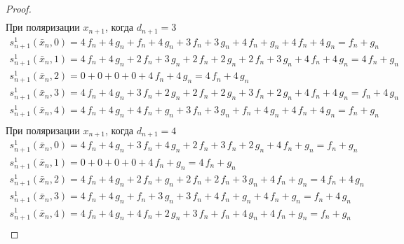 \documentclass[bibliography=totoc, a4paper, 14pt]{extarticle}
\begin{document}
\begin{proof}
$$\begin{array}{l}
\end{array}$$
При поляризации $x_{n+1}$, когда $d_{n+1} = 3$
$$\begin{array}{l}
s_{n+1}^1(\bar{x}_n, 0) = 4\,f_n + 4\,g_n + f_n + 4\,g_n + 3\,f_n + 3\,g_n + 4\,f_n + g_n + 4\,f_n + 4\,g_n = f_n + g_n \\
s_{n+1}^1(\bar{x}_n, 1) = 4\,f_n + 4\,g_n + 2\,f_n + 3\,g_n + 2\,f_n + 2\,g_n + 2\,f_n + 3\,g_n + 4\,f_n + 4\,g_n = 4\,f_n + g_n \\
s_{n+1}^1(\bar{x}_n, 2) = 0 + 0 + 0 + 0 + 4\,f_n + 4\,g_n = 4\,f_n + 4\,g_n \\
s_{n+1}^1(\bar{x}_n, 3) = 4\,f_n + 4\,g_n + 3\,f_n + 2\,g_n + 2\,f_n + 2\,g_n + 3\,f_n + 2\,g_n + 4\,f_n + 4\,g_n = f_n + 4\,g_n \\
s_{n+1}^1(\bar{x}_n, 4) = 4\,f_n + 4\,g_n + 4\,f_n + g_n + 3\,f_n + 3\,g_n + f_n + 4\,g_n + 4\,f_n + 4\,g_n = f_n + g_n \\
\end{array}$$
При поляризации $x_{n+1}$, когда $d_{n+1} = 4$
$$\begin{array}{l}
s_{n+1}^1(\bar{x}_n, 0) = 4\,f_n + 4\,g_n + 3\,f_n + 4\,g_n + 2\,f_n + 3\,f_n + 2\,g_n + 4\,f_n + g_n = f_n + g_n \\
s_{n+1}^1(\bar{x}_n, 1) = 0 + 0 + 0 + 0 + 4\,f_n + g_n = 4\,f_n + g_n \\
s_{n+1}^1(\bar{x}_n, 2) = 4\,f_n + 4\,g_n + 2\,f_n + g_n + 2\,f_n + 2\,f_n + 3\,g_n + 4\,f_n + g_n = 4\,f_n + 4\,g_n \\
s_{n+1}^1(\bar{x}_n, 3) = 4\,f_n + 4\,g_n + f_n + 3\,g_n + 3\,f_n + 4\,f_n + g_n + 4\,f_n + g_n = f_n + 4\,g_n \\
s_{n+1}^1(\bar{x}_n, 4) = 4\,f_n + 4\,g_n + 4\,f_n + 2\,g_n + 3\,f_n + f_n + 4\,g_n + 4\,f_n + g_n = f_n + g_n \\
\end{array}$$

\end{proof}
\end{document}
